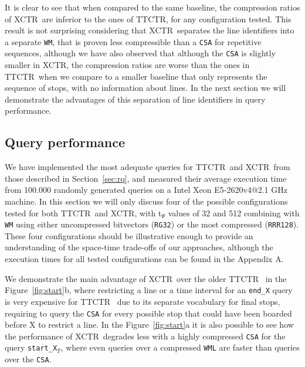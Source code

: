\documentclass[runningheads]{llncs}
\newcommand{\ctr}{XCTR}
\newcommand{\ttctr}{TTCTR}
\begin{document}
It is clear to see that when compared to the same baseline, the compression ratios of \ctr~are inferior to the ones of \ttctr, for any configuration tested. This result is not surprising considering that \ctr~separates the line identifiers into a separate \texttt{WM}, that is proven less compressible than a \texttt{CSA} for repetitive sequences, although we have also observed that although the \texttt{CSA} is slightly smaller in \ctr, the compression ratios are worse than the ones in \ttctr~when we compare to a smaller baseline that only represents the sequence of stops, with no information about lines. In the next section we will demonstrate the advantages of this separation of line identifiers in query performance.

\subsection{Query performance}
\label{sec:time}
We have implemented the most adequate queries for \ttctr~and \ctr~from those described in Section~\ref{sec:rq}, and measured their average execution time from 100.000 randomly generated queries on a Intel Xeon E5-2620v4@2.1 GHz machine. In this section we will only discuss four of the possible configurations tested for both \ttctr~and \ctr, with t$_{\Psi}$ values of 32 and 512 combining with \texttt{WM} using either uncompressed bitvectors (\texttt{RG32}) or the most compressed (\texttt{RRR128}). These four configurations should be illustrative enough to provide an understanding of the space-time trade-offs of our approaches, although the execution times for all tested configurations can be found in the Appendix A.

We demonstrate the main advantage of \ctr~over the older \ttctr~ in the Figure~\ref{fig:start}b, where restricting a line or a time interval for an \texttt{end\_X} query is very expensive for \ttctr~ due to its separate vocabulary for final stops, requiring to query the \texttt{CSA} for every possible stop that could have been boarded before X to restrict a line. In the Figure~\ref{fig:start}a it is also possible to see how the performance of \ctr~degrades less with a highly compressed \texttt{CSA} for the query \texttt{start\_X$_T$}, where even queries over a compressed \texttt{WML} are faster than queries over the \texttt{CSA}.

\end{document}
